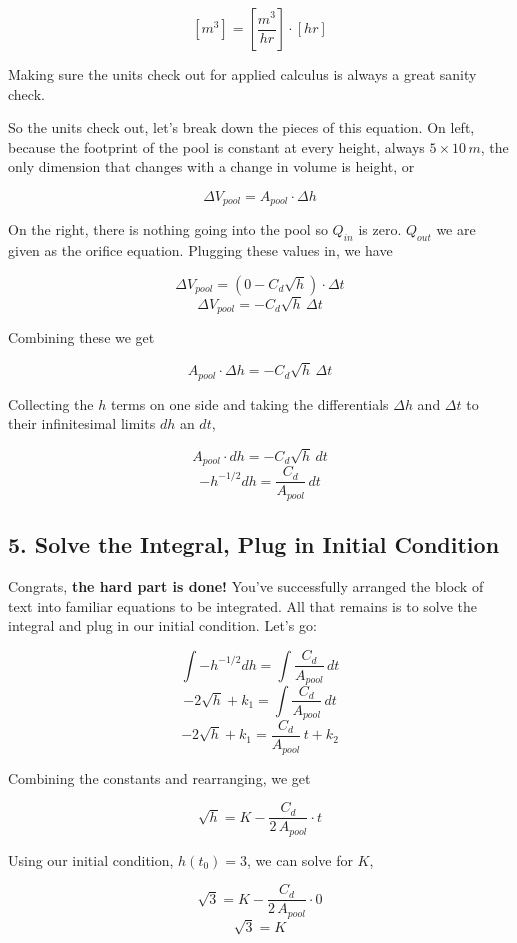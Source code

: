 \documentclass[11pt]{article}
\begin{document}
\[\left[m^3\right] = \left[\frac{m^3}{hr}\right] \cdot \left[hr\right]\]

Making sure the units check out for applied calculus is always a great
sanity check.

So the units check out, let's break down the pieces of this equation. On
left, because the footprint of the pool is constant at every height,
always \(5 \times 10 \, m\), the only dimension that changes with a
change in volume is height, or

\[\Delta V_{pool} = A_{pool} \cdot \Delta h\]

On the right, there is nothing going into the pool so \(Q_{in}\) is
zero. \(Q_{out}\) we are given as the orifice equation. Plugging these
values in, we have

\[\Delta V_{pool} = \left(0 - C_d \sqrt{h} \right) \cdot \Delta t\]
\[\Delta V_{pool} = - C_d \sqrt{h} \, \Delta t\]

Combining these we get

\[A_{pool} \cdot \Delta h = - C_d \sqrt{h} \, \Delta t\]

Collecting the \(h\) terms on one side and taking the differentials
\(\Delta h\) and \(\Delta t\) to their infinitesimal limits \(d h\) an
\(d t\),

\[A_{pool} \cdot dh = - C_d \sqrt{h} \, dt\]
\[- h^{-1/2} dh = \frac{C_d}{A_{pool}} \, dt\]

    \hypertarget{solve-the-integral-plug-in-initial-condition}{%
\subsection{5. Solve the Integral, Plug in Initial
Condition}\label{solve-the-integral-plug-in-initial-condition}}

Congrats, \textbf{the hard part is done!} You've successfully arranged
the block of text into familiar equations to be integrated. All that
remains is to solve the integral and plug in our initial condition.
Let's go:

\[\int - h^{-1/2} dh = \int \frac{C_d}{A_{pool}} \, dt\]
\[-2 \sqrt{h} + k_1 = \int \frac{C_d}{A_{pool}} \, dt\]
\[-2 \sqrt{h} + k_1 = \frac{C_d}{A_{pool}} \, t + k_2\]

Combining the constants and rearranging, we get

\[\sqrt{h} = K - \frac{C_d}{2 \, A_{pool}} \cdot t\]

Using our initial condition, \(h(t_0) = 3\), we can solve for \(K\),

\[\sqrt{3} = K - \frac{C_d}{2 \, A_{pool}} \cdot 0\] \[\sqrt{3} = K\]
\end{document}

